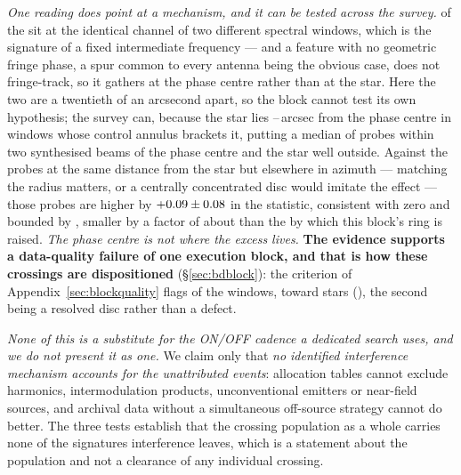 \emph{One reading does point at a mechanism, and it can be tested across the
survey.} \DqBlockIfMult{} of the \DqBlockNCross{} sit at the identical
channel of two different spectral windows, which is the signature of a fixed
intermediate frequency --- and a feature with no geometric fringe phase, a
spur common to every antenna being the obvious case, does not fringe-track,
so it gathers at the phase centre rather than at the star. Here the two are a
twentieth of an arcsecond apart, so the block cannot test its own hypothesis;
the survey can, because the star lies \EvPcOffLo--\EvPcOffHi\,arcsec from the
phase centre in \EvPcNWin{} windows whose control annulus brackets it,
putting a median of \EvPcNNear{} probes within two synthesised beams of the
phase centre and the star well outside. Against the probes at the same
distance from the star but elsewhere in azimuth --- matching the radius
matters, or a centrally concentrated disc would imitate the effect --- those
probes are higher by $+0.09\pm0.08$ in the statistic, consistent with
zero and bounded by \EvPcBound, smaller by a factor of about \EvPcFactor{}
than the \EvPcNeed{} by which this block's ring is raised. \emph{The phase
centre is not where the excess lives.}
\textbf{The evidence supports a
data-quality failure of one execution block, and that is how these
\EvNCrossFlag{} crossings are dispositioned} (\S\ref{sec:bdblock}): the
criterion of Appendix~\ref{sec:blockquality} flags \DqNWin{} of the
\NWindows{} windows, toward \DqNStar{} stars (\DqStars), the second being a
resolved disc rather than a defect.

\emph{None of this is a substitute for the ON/OFF cadence a dedicated search
uses, and we do not present it as one.} We claim only that \emph{no
identified interference mechanism accounts for the unattributed events}:
allocation tables cannot exclude harmonics, intermodulation products,
unconventional emitters or near-field sources, and archival data without a
simultaneous off-source strategy cannot do better. The three tests establish
that the crossing population as a whole carries none of the signatures
interference leaves, which is a statement about the population and not a
clearance of any individual crossing.

